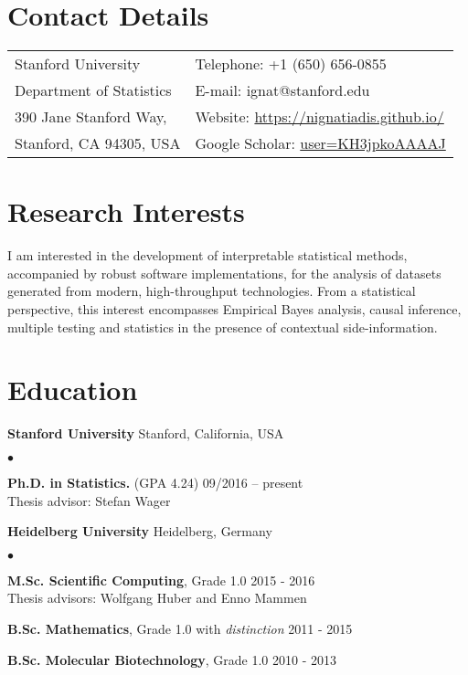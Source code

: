 \documentclass[margin,line]{res}
\newenvironment{list2}{
  \begin{list}{$\bullet$}{%
      \setlength{\itemsep}{0in}
      \setlength{\parsep}{0in} \setlength{\parskip}{0in}
      \setlength{\topsep}{0in} \setlength{\partopsep}{0in}
      \setlength{\leftmargin}{0.2in}}}{\end{list}}
\begin{document}

\begin{resume}
\section{\sc Contact Details}
\vspace{.05in}
\begin{tabular}{@{}p{2in}p{4in}}
Stanford University             & {Telephone:}  +1 (650) 656-0855 \\
Department of Statistics   & {E-mail:}    ignat@stanford.edu \\
390 Jane Stanford Way, &  {Website:} \href{https://nignatiadis.github.io/}{https://nignatiadis.github.io/}\\
Stanford, CA 94305, USA  & {Google Scholar:} \href{https://scholar.google.com/citations?user=KH3jpkoAAAAJ}{user=KH3jpkoAAAAJ} \\
\end{tabular}



\section{\sc Research Interests}
I am interested in the development of interpretable statistical methods, accompanied by robust software implementations, for the analysis of datasets generated from modern, high-throughput technologies. From a statistical perspective, this interest encompasses Empirical Bayes analysis, causal inference, multiple testing and statistics in the presence of contextual side-information.

\section{\sc Education}
{\bf Stanford University} \hfill Stanford, California, USA\\
\vspace*{-.14in}
\begin{list2}
\item
\textbf{Ph.D. in Statistics.}  (GPA 4.24) \hfill  09/2016 -- present\\
Thesis advisor: Stefan Wager
\end{list2}

\vspace*{-2.5mm}
{\bf {Heidelberg University}} \hfill  {Heidelberg, Germany}\\
\vspace*{-.14in}
\begin{list2}
\item \textbf{M.Sc. Scientific Computing}, Grade 1.0 \hfill 2015 - 2016\\
Thesis advisors: Wolfgang Huber and Enno Mammen 
\item \textbf{B.Sc. Mathematics}, Grade 1.0 with \emph{distinction} \hfill 2011 - 2015
\item \textbf{B.Sc. Molecular Biotechnology}, Grade 1.0 \hfill 2010 - 2013
\end{list2}



\end{resume}
\end{document}
